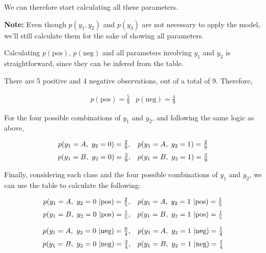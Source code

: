 \documentclass[12pt]{article}
\begin{document}
\begin{enumerate}[leftmargin=\labelsep,resume]
          We can therefore start calculating all these parameters.

          \textbf{Note:} Even though $p(y_1, y_2)$ and $p(y_3)$ are not necessary
          to apply the model, we'll still calculate them for the sake of showing
          all parameters.

          Calculating $p(\text{pos})$, $p(\text{neg})$ and all parameters involving $y_1$ and
          $y_2$ is straightforward, since they can be infered from the table.

          There are 5 positive and 4 negative observations, out of a total of 9.
          Therefore,

          \[
              \begin{array}{cc}
                  p(\text{pos}) = \frac{5}{9} &
                  p(\text{neg}) = \frac{4}{9}
              \end{array}
          \]

          For the four possible combinations of $y_1$ and $y_2$, and following
          the same logic as above,

          \[
              \begin{array}{cc}
                  p(y_1 = A, \ y_2 = 0) = \frac{2}{9}, &
                  p(y_1 = A, \ y_2 = 1) = \frac{2}{9}    \\[\medskipamount]
                  p(y_1 = B, \ y_2 = 0) = \frac{3}{9}, &
                  p(y_1 = B, \ y_2 = 1) = \frac{2}{9}
              \end{array}
          \]

          Finally, considering each class and the four possible combinations
          of $y_1$ and $y_2$, we can use the table to calculate the following:

          \[
              \begin{array}{cc}
                  p(y_1 = A, \ y_2 = 0 \ | \text{pos}) = \frac{2}{5}, &
                  p(y_1 = A, \ y_2 = 1 \ | \text{pos}) = \frac{1}{5}    \\[\medskipamount]
                  p(y_1 = B, \ y_2 = 0 \ | \text{pos}) = \frac{1}{5}, &
                  p(y_1 = B, \ y_2 = 1 \ | \text{pos}) = \frac{1}{5}
              \end{array}
          \]

          \[
              \begin{array}{cc}
                  p(y_1 = A, \ y_2 = 0 \ | \text{neg}) = \frac{0}{4}, &
                  p(y_1 = A, \ y_2 = 1 \ | \text{neg}) = \frac{1}{4}    \\[\medskipamount]
                  p(y_1 = B, \ y_2 = 0 \ | \text{neg}) = \frac{2}{4}, &
                  p(y_1 = B, \ y_2 = 1 \ | \text{neg}) = \frac{1}{4}
              \end{array}
          \]


\end{enumerate}
\end{document}
